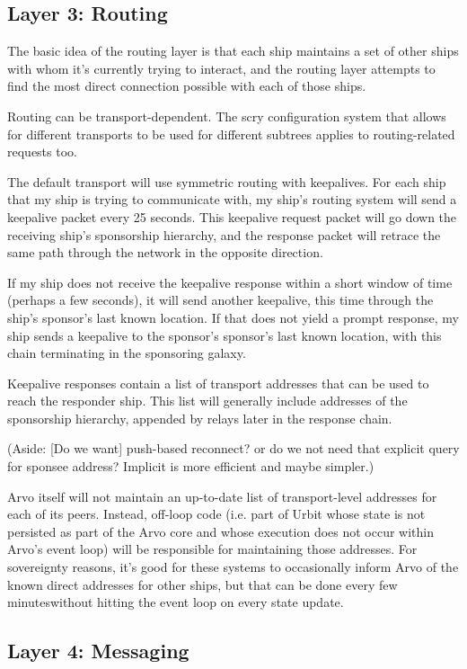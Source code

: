 \documentclass[twoside]{article}
\begin{document}
\subsection{Layer 3: Routing}

The basic idea of the routing layer is that each ship maintains a set of other ships with whom it's currently trying to interact, and the routing layer attempts to find the most direct connection possible with each of those ships.

Routing can be transport-dependent. The scry configuration system that allows for different transports to be used for different subtrees applies to routing-related requests too.

The default transport will use symmetric routing with keepalives. For each ship that my ship is trying to communicate with, my ship's routing system will send a keepalive packet every 25 seconds. This keepalive request packet will go down the receiving ship's sponsorship hierarchy, and the response packet will retrace the same path through the network in the opposite direction.

If my ship does not receive the keepalive response within a short window of time (perhaps a few seconds), it will send another keepalive, this time through the ship's sponsor's last known location. If that does not yield a prompt response, my ship sends a keepalive to the sponsor's sponsor's last known location, with this chain terminating in the sponsoring galaxy.

Keepalive responses contain a list of transport addresses that can be used to reach the responder ship. This list will generally include addresses of the sponsorship hierarchy, appended by relays later in the response chain.

(Aside:  [Do we want] push-based reconnect? or do we not need that explicit query for sponsee address? Implicit is more efficient and maybe simpler.)

Arvo itself will not maintain an up-to-date list of transport-level addresses for each of its peers. Instead, off-loop code (i.e. part of Urbit whose state is not persisted as part of the Arvo core and whose execution does not occur within Arvo's event loop) will be responsible for maintaining those addresses. For sovereignty reasons, it's good for these systems to occasionally inform Arvo of the known direct addresses for other ships, but that can be done every few minuteswithout hitting the event loop on every state update.

\subsection{Layer 4: Messaging}
\end{document}
